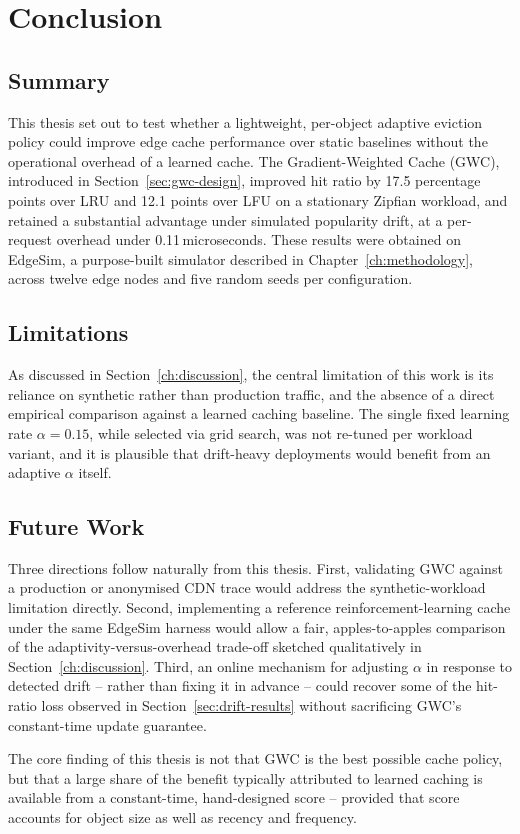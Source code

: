 \chapter{Conclusion}
\label{ch:conclusion}

\section{Summary}
This thesis set out to test whether a lightweight, per-object adaptive eviction policy could
improve edge cache performance over static baselines without the operational overhead of a
learned cache. The Gradient-Weighted Cache (GWC), introduced in
Section~\ref{sec:gwc-design}, improved hit ratio by 17.5 percentage points over LRU and
12.1 points over LFU on a stationary Zipfian workload, and retained a substantial advantage
under simulated popularity drift, at a per-request overhead under 0.11\,microseconds. These
results were obtained on EdgeSim, a purpose-built simulator described in
Chapter~\ref{ch:methodology}, across twelve edge nodes and five random seeds per
configuration.

\section{Limitations}
As discussed in Section~\ref{ch:discussion}, the central limitation of this work is its
reliance on synthetic rather than production traffic, and the absence of a direct empirical
comparison against a learned caching baseline. The single fixed learning rate
$\alpha = 0.15$, while selected via grid search, was not re-tuned per workload variant, and
it is plausible that drift-heavy deployments would benefit from an adaptive $\alpha$ itself.

\section{Future Work}
Three directions follow naturally from this thesis. First, validating GWC against a
production or anonymised CDN trace would address the synthetic-workload limitation directly.
Second, implementing a reference reinforcement-learning cache under the same EdgeSim harness
would allow a fair, apples-to-apples comparison of the adaptivity-versus-overhead trade-off
sketched qualitatively in Section~\ref{ch:discussion}. Third, an online mechanism for
adjusting $\alpha$ in response to detected drift -- rather than fixing it in advance -- could
recover some of the hit-ratio loss observed in Section~\ref{sec:drift-results} without
sacrificing GWC's constant-time update guarantee.

\begin{keytakeaway}
The core finding of this thesis is not that GWC is the best possible cache policy, but that a
large share of the benefit typically attributed to learned caching is available from a
constant-time, hand-designed score -- provided that score accounts for object size as well
as recency and frequency.
\end{keytakeaway}

